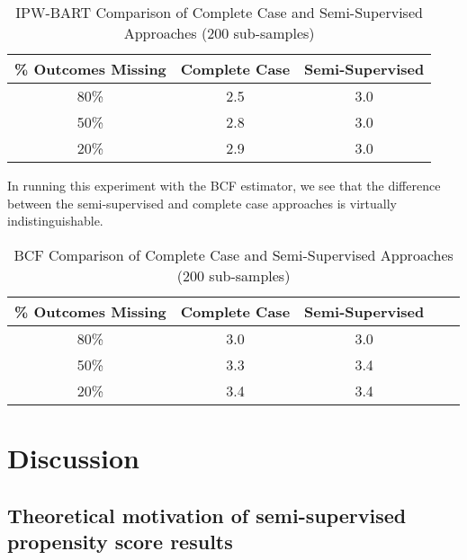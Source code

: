 \documentclass[aos]{imsart}
\begin{document}
\begin{table}[ht]
\centering
\begingroup\small
\begin{tabular}{ccc}
  \hline
\% Outcomes Missing & Complete Case & Semi-Supervised \\ 
  \hline
80\% & 2.5 & 3.0 \\ 
50\% & 2.8 & 3.0 \\ 
20\% & 2.9 & 3.0 \\ 
   \hline
\end{tabular}
\endgroup
\caption{IPW-BART Comparison of Complete Case and Semi-Supervised Approaches (200 sub-samples)} 
\end{table}

In running this experiment with the BCF estimator, we see that the difference between the semi-supervised and complete case approaches is virtually indistinguishable. 

\begin{table}[ht]
\centering
\begingroup\small
\begin{tabular}{ccccc}
  \hline
\% Outcomes Missing & Complete Case & Semi-Supervised \\ 
  \hline
80\% & 3.0 & 3.0 \\ 
50\% & 3.3 & 3.4 \\ 
20\% & 3.4 & 3.4 \\ 
   \hline
\end{tabular}
\endgroup
\caption{BCF Comparison of Complete Case and Semi-Supervised Approaches (200 sub-samples)} 
\end{table}

\section{Discussion}

\subsection{Theoretical motivation of semi-supervised propensity score results}
\label{subsection:theoretical}
\end{document}
